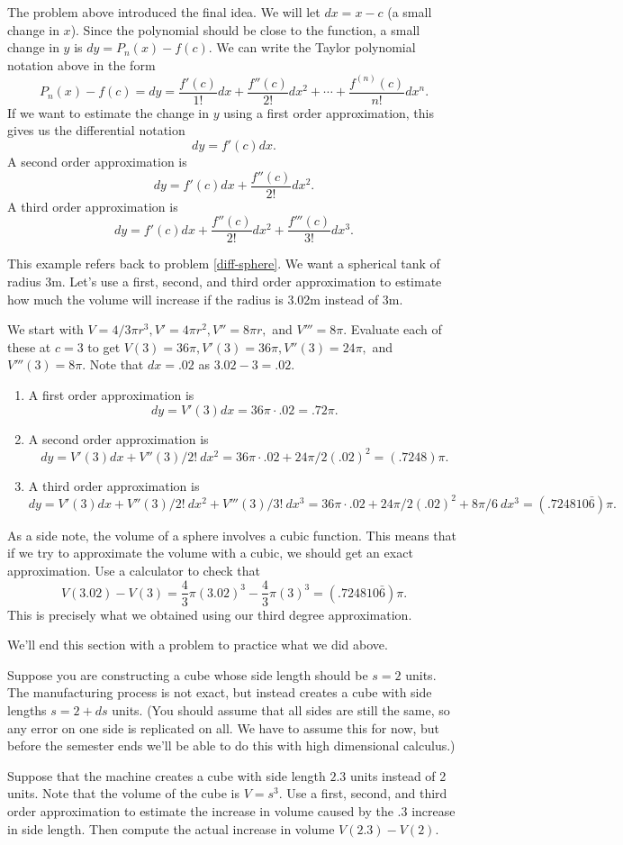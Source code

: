 The problem above introduced the final idea. We will let $dx=x-c$ (a small change in $x$). Since the polynomial should be close to the function, a small change in $y$ is $dy=P_n(x)-f(c)$. We can write the Taylor polynomial notation above in the form  
$$P_n(x) - f(c)=dy=\frac{f'(c)}{1!}dx+\frac{f''(c)}{2!}dx^2+\cdots +\frac{f^{(n)}(c)}{n!}dx^n. $$
If we want to estimate the change in $y$ using a first order approximation, this gives us the differential notation
$$dy = f'(c)dx.$$
A second order approximation is
$$dy = f'(c)dx + \frac{f''(c)}{2!}dx^2.$$
A third order approximation is
$$dy = f'(c)dx + \frac{f''(c)}{2!}dx^2+  \frac{f'''(c)}{3!}dx^3.$$

\begin{example}
This example refers back to problem \ref{diff-sphere}. We want a spherical tank of radius 3m. Let's use a first, second, and third order approximation to estimate how much the volume will increase if the radius is 3.02m instead of 3m.  

We start with $V=4/3 \pi r^3, V'=4\pi r^2, V''=8\pi r,$ and $V'''=8\pi$. Evaluate each of these at $c=3$ to get $V(3)=36\pi, V'(3)=36\pi, V''(3)=24\pi,$ and $V'''(3)=8\pi$. Note that $dx=.02$ as $3.02-3=.02$.
\begin{enumerate}
\item A first order approximation is $$dy=V'(3)dx = 36\pi\cdot .02 = .72\pi.$$
\item A second order approximation is $$dy=V'(3)dx+V''(3)/2!\ dx^2  = 36\pi\cdot .02 +24\pi/2 (.02)^2 =(.7248)\pi.$$
\item A third order approximation is $$dy=V'(3)dx+V''(3)/2!\ dx^2 +V'''(3)/3!\ dx^3  = 36\pi\cdot .02 +24\pi/2 (.02)^2+8\pi/6\ dx^3  =(.724810\bar6)\pi.$$
\end{enumerate}
As a side note, the volume of a sphere involves a cubic function. This means that if we try to approximate the volume with a cubic, we should get an exact approximation.  Use a calculator to check that $$V(3.02)-V(3) = \frac 43 \pi (3.02)^3 - \frac 43 \pi (3)^3 =  (.724810\bar6)\pi.$$ This is precisely what we obtained using our third degree approximation.
\end{example}

We'll end this section with a problem to practice what we did above.

\begin{problem}
Suppose you are constructing a cube whose side length should be $s=2$ units. The manufacturing process is not exact, but instead creates a cube with side lengths $s=2+ds$ units. (You should assume that all sides are still the same, so any error on one side is replicated on all.  We have to assume this for now, but before the semester ends we'll be able to do this with high dimensional calculus.) 

Suppose that the machine creates a cube with side length $2.3$ units instead of 2 units.  Note that the volume of the cube is $V=s^3$.  Use a first, second, and third order approximation to estimate the increase in volume caused by the .3 increase in side length.  Then compute the actual increase in volume $V(2.3)-V(2)$.   
\end{problem}




